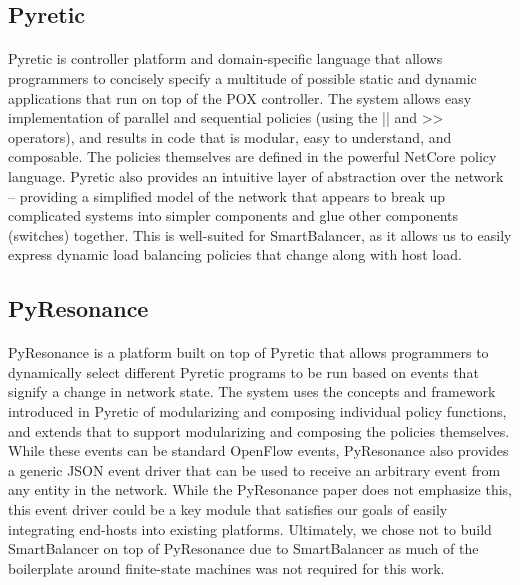 \documentclass[10pt]{article}
\begin{document}
\subsection{Pyretic}

\paragraph{} Pyretic\cite{Pyretic} is controller platform and domain-specific language that allows programmers to concisely specify a multitude of possible static and dynamic applications that run on top of the POX controller. The system allows easy implementation of parallel and sequential policies (using the || and >> operators), and results in code that is modular, easy to understand, and composable. The policies themselves are defined in the powerful NetCore policy language. Pyretic also provides an intuitive layer of abstraction over the network – providing a simplified model of the network that appears to break up complicated systems into simpler components and glue other components (switches) together. This is well-suited for SmartBalancer, as it allows us to easily express dynamic load balancing policies that change along with host load.


\subsection{PyResonance}

\paragraph{} PyResonance\cite{PyResonance} is a platform built on top of Pyretic that allows programmers to dynamically select different Pyretic programs to be run based on events that signify a change in network state. The system uses the concepts and framework introduced in Pyretic of modularizing and composing individual policy functions, and extends that to support modularizing and composing the policies themselves. While these events can be standard OpenFlow events, PyResonance also provides a generic JSON event driver that can be used to receive an arbitrary event from any entity in the network. While the PyResonance paper does not emphasize this, this event driver could be a key module that satisfies our goals of easily integrating end-hosts into existing platforms. Ultimately, we chose not to build SmartBalancer on top of PyResonance due to SmartBalancer as much of the boilerplate around finite-state machines was not required for this work.
\end{document}
